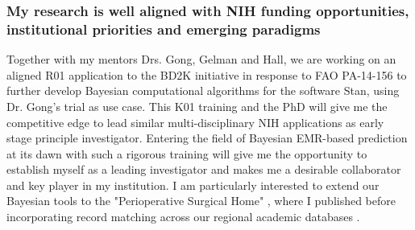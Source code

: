 \documentclass[11pt,notitlepage]{article}
\begin{document}
\subsubsection*{My research is well aligned with NIH funding opportunities, institutional priorities and emerging paradigms}
Together with my mentors Drs. Gong, Gelman and Hall, we are working on an aligned R01 application to the BD2K initiative in response to FAO PA-14-156 to further develop Bayesian computational algorithms for the software Stan, using Dr. Gong's trial as use case. This K01 training and the PhD will give me the competitive edge to lead similar multi-disciplinary NIH applications as early stage principle investigator. Entering the field of Bayesian EMR-based prediction at its dawn with such a rigorous training will give me the opportunity to establish myself as a leading investigator and makes me a desirable collaborator and key player in my institution. I am particularly interested to extend our Bayesian tools to  the "Perioperative Surgical Home" \cite{Vetter_24781579}, where I published before \cite{Andreae_23811426} incorporating record matching across our regional academic databases \cite{Kaushal_24821739}.



\newpage


\end{document}
